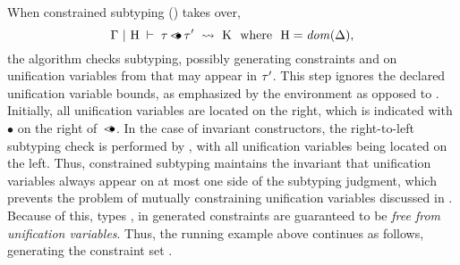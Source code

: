 When constrained subtyping () takes over,
\[ \Gamma~\vert~\mathrm{H}\;\vdash\;\tau \operatorname{\lessdot\!\!\bullet} \tau'\ \rightsquigarrow\ \mathrm{K}\ \text{ where }\ \mathrm{H} = \operatorname{\mathit{dom}}(\Delta), \]
the algorithm checks subtyping, possibly generating constraints 
\ctrsub{\tylb}{\va} and \ctrsub{\va}{\tyub} on
unification variables \va from \UEnvD that may appear in $\tau'$.
This step ignores the declared unification variable bounds,
as emphasized by the environment \UEnvD as opposed to \UEnv.
Initially, all unification variables are located on the right,
which is indicated with $\bullet$ on the right of~$\operatorname{\lessdot\!\!\bullet}$.
In the case of invariant constructors, the right-to-left subtyping check
is performed by , with all unification variables
being located on the left.
Thus, constrained subtyping maintains the invariant that unification
variables always appear on at most one side of the subtyping judgment,
which prevents the problem of mutually constraining unification variables
discussed in .
Because of this, types \tylb, \tyub in generated constraints are guaranteed to
be \emph{free from unification variables}.
Thus, the running example above continues as follows,
generating the constraint set {\ctrset{\ctrsub{\vx}{\va}, \ctrsub{\va}{\vx}}}.

